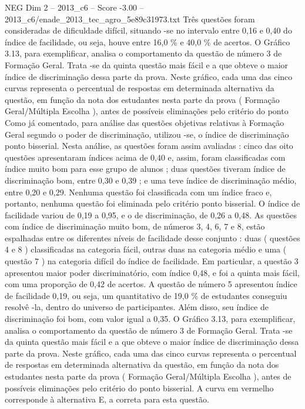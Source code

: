 \begin{textsample}{NEG Dim 2 – 2013\_c6 – Score -3.00 – 2013\_c6/enade\_2013\_tec\_agro\_5e89c31973.txt}
Três questões foram consideradas de dificuldade difícil, situando -se no intervalo entre 0,16 e 0,40 do índice de facilidade, ou seja, houve entre 16,0 \% e 40,0 \% de acertos.
O Gráfico 3.13, para exemplificar, analisa o comportamento da questão de número 3 de Formação Geral.
Trata -se da quinta questão mais fácil e a que obteve o maior índice de discriminação dessa parte da prova.
Neste gráfico, cada uma das cinco curvas representa o percentual de respostas em determinada alternativa da questão, em função da nota dos estudantes nesta parte da prova ( Formação Geral/Múltipla Escolha ), antes de possíveis eliminações pelo critério do ponto Como já comentado, para análise das questões objetivas relativas à Formação Geral segundo o poder de discriminação, utilizou -se, o índice de discriminação ponto bisserial.
Nesta análise, as questões foram assim avaliadas : cinco das oito questões apresentaram índices acima de 0,40 e, assim, foram classificadas com índice muito bom para esse grupo de alunos ; duas questões tiveram índice de discriminação bom, entre 0,30 e 0,39 ; e uma teve índice de discriminação médio, entre 0,20 e 0,29.
Nenhuma questão foi classificada com um índice fraco e, portanto, nenhuma questão foi eliminada pelo critério ponto bisserial.
O índice de facilidade variou de 0,19 a 0,95, e o de discriminação, de 0,26 a 0,48.
As questões com índice de discriminação muito bom, de números 3, 4, 6, 7 e 8, estão espalhadas entre os diferentes níveis de facilidade desse conjunto : duas ( questões 4 e 8 ) classificadas na categoria fácil, outras duas na categoria médio e uma ( questão 7 ) na categoria difícil do índice de facilidade.
Em particular, a questão 3 apresentou maior poder discriminatório, com índice 0,48, e foi a quinta mais fácil, com uma proporção de 0,42 de acertos.
A questão de número 5 apresentou índice de facilidade 0,19, ou seja, um quantitativo de 19,0 \% de estudantes conseguiu resolvê -la, dentro do universo de participantes.
Além disso, seu índice de discriminação foi bom, com valor igual a 0,35.
O Gráfico 3.13, para exemplificar, analisa o comportamento da questão de número 3 de Formação Geral.
Trata -se da quinta questão mais fácil e a que obteve o maior índice de discriminação dessa parte da prova.
Neste gráfico, cada uma das cinco curvas representa o percentual de respostas em determinada alternativa da questão, em função da nota dos estudantes nesta parte da prova ( Formação Geral/Múltipla Escolha ), antes de possíveis eliminações pelo critério do ponto bisserial.
A curva em vermelho corresponde à alternativa E, a correta para esta questão.

\end{textsample}
